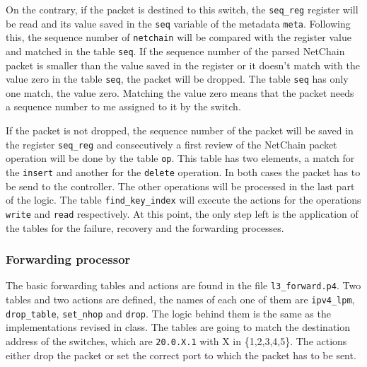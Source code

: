 \documentclass[11pt,oneside,a4paper]{article}
\begin{document}
On the contrary, if the packet is destined to this switch, the {\color{red}\texttt{seq\_reg}} register will be read and its value saved in the {\color{red}\texttt{seq}} variable of the metadata {\color{red}\texttt{meta}}. Following this, the sequence number of {\color{red}\texttt{netchain}} will be compared with the register value and matched in the table {\color{red}\texttt{seq}}. If the sequence number of the parsed NetChain packet is smaller than the value saved in the register or it doesn't match with the value zero in the table {\color{red}\texttt{seq}}, the packet will be dropped. The table {\color{red}\texttt{seq}} has only one match, the value zero. Matching the value zero means that the packet needs a sequence number to me assigned to it by the switch.

If the packet is not dropped, the sequence number of the packet will be saved in the register {\color{red}\texttt{seq\_reg}} and consecutively a first review of the NetChain packet operation will be done by the table {\color{red}\texttt{op}}. This table has two elements, a match for the {\color{brown}\texttt{insert}} and another for the {\color{brown}\texttt{delete}} operation. In both cases the packet has to be send to the controller.
The other operations will be processed in the last part of the logic. The table {\color{red}\texttt{find\_key\_index}} will execute the actions for the operations {\color{brown}\texttt{write}} and {\color{brown}\texttt{read}} respectively. At this point, the only step left is the application of the tables for the failure, recovery and the forwarding processes. 

\subsubsection{Forwarding processor}

The basic forwarding tables and actions are found in the file {\color{red}\texttt{l3\_forward.p4}}. Two tables and two actions are defined, the names of each one of them are {\color{red}\texttt{ipv4\_lpm}}, {\color{red}\texttt{drop\_table}}, {\color{red}\texttt{set\_nhop}} and {\color{red}\texttt{drop}}. The logic behind them is the same as the implementations revised in class. The tables are going to match the destination address of the switches, which are {\color{brown}\texttt{20.0.X.1}} with X in \{1,2,3,4,5\}. The actions either drop the packet or set the correct port to which the packet has to be sent. 
\end{document}
